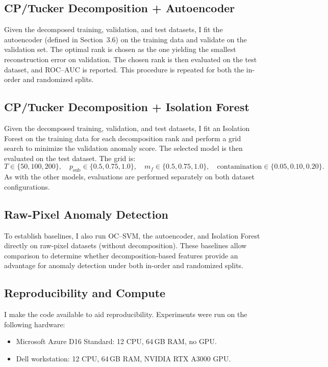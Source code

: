 \documentclass[pdflatex,sn-mathphys-ay]{sn-jnl}
\begin{document}
\subsection{CP/Tucker Decomposition + Autoencoder}
Given the decomposed training, validation, and test datasets, I fit the autoencoder (defined in Section~3.6) on the training data and validate on the validation set. The optimal rank is chosen as the one yielding the smallest reconstruction error on validation. The chosen rank is then evaluated on the test dataset, and ROC--AUC is reported. This procedure is repeated for both the in-order and randomized splits.

\subsection{CP/Tucker Decomposition + Isolation Forest}
Given the decomposed training, validation, and test datasets, I fit an Isolation Forest on the training data for each decomposition rank and perform a grid search to minimize the validation anomaly score. The selected model is then evaluated on the test dataset. The grid is:
\[
T \in \{50,100,200\},\quad
p_{\text{sub}} \in \{0.5,0.75,1.0\},\quad
m_f \in \{0.5,0.75,1.0\},\quad
\text{contamination} \in \{0.05,0.10,0.20\}.
\]
As with the other models, evaluations are performed separately on both dataset configurations.

\subsection{Raw-Pixel Anomaly Detection}
To establish baselines, I also run OC\mbox{--}SVM, the autoencoder, and Isolation Forest directly on raw-pixel datasets (without decomposition). These baselines allow comparison to determine whether decomposition-based features provide an advantage for anomaly detection under both in-order and randomized splits.

\subsection{Reproducibility and Compute}
I make the code available to aid reproducibility. Experiments were run on the following hardware:
\begin{itemize}
  \item Microsoft Azure D16 Standard: 12 CPU, 64\,GB RAM, no GPU.
  \item Dell workstation: 12 CPU, 64\,GB RAM, NVIDIA RTX A3000 GPU.
\end{itemize}
\end{document}
